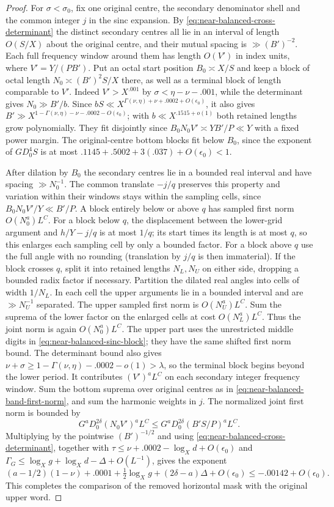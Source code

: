 \documentclass[11pt,a4paper]{article}
\theoremstyle{paperplain}
\numberwithin{equation}{section}
\begin{document}
\begin{proof}
For $\sigma<\sigma_0$, fix one original centre, the
secondary denominator shell and the common integer $j$
in the sinc expansion. By
\eqref{eq:near-balanced-cross-determinant} the distinct
secondary centres all lie in an interval of length $O(S/X)$
about the original centre, and their mutual spacing is
$\gg (B')^{-2}$. Each full frequency window around them
has length $O(V')$ in index units, where $V'=Y/(PB')$.
Put an octal start position $B_0\asymp X/S$ and keep a
block of octal length $N_0\asymp (B')^2 S/X$ there, as
well as a terminal block of length comparable to $V'$.
Indeed $V'>X^{.001}$ by $\sigma<\eta-\nu-.001$, while the
determinant gives $N_0\gg B'/b$. Since $bS\ll
X^{\Gamma(\nu,\eta)+\nu+.0002+O(\epsilon_0)}$, it also gives
$B'\gg X^{1-\Gamma(\nu,\eta)-\nu-.0002-O(\epsilon_0)}$;
with $b\ll X^{.1515+o(1)}$ both retained lengths grow polynomially.
They fit disjointly since $B_0N_0V'\asymp YB'/P\ll Y$
with a fixed power margin. The original-centre bottom
blocks fit below $B_0$, since the exponent of $GD_0^4S$
is at most $.1145+.5002+3(.037)+O(\epsilon_0)<1$.

After dilation by $B_0$ the secondary centres lie in a
bounded real interval and have spacing $\gg N_0^{-1}$.
The common translate $-j/q$ preserves this property and
variation within their windows stays within the sampling
cells, since $B_0N_0V'/Y\ll B'/P$. A block entirely below
or above $q$ has sampled first norm $O(N_0^a)L^C$.
For a block below $q$, the displacement between the lower-grid
argument and $h/Y-j/q$ is at most $1/q$; its start times its
length is at most $q$, so this enlarges each sampling cell by only
a bounded factor. For a block above $q$ use the full angle with no
rounding (translation by $j/q$ is then immaterial). If the block crosses
$q$, split it into retained lengths $N_L,N_U$ on either
side, dropping a bounded radix factor if necessary.
Partition the dilated real angles into cells of width
$1/N_L$. In each cell the upper arguments lie in a
bounded interval and are $\gg N_U^{-1}$ separated. The
upper sampled first norm is $O(N_U^a)L^C$. Sum the
suprema of the lower factor on the enlarged cells at
cost $O(N_L^a)L^C$. Thus the joint norm is again
$O(N_0^a)L^C$. The upper part uses the unrestricted
middle digits in \eqref{eq:near-balanced-sinc-block};
they have the same shifted first norm bound. The determinant bound also gives $\nu+\sigma\ge1-\Gamma(\nu,\eta)-.0002-o(1)>\lambda$,
so the terminal block begins beyond the lower period. It contributes
$(V')^a L^C$ on each
secondary integer frequency window. Sum the bottom
suprema over original centres as in
\eqref{eq:near-balanced-band-first-norm}, and sum the
harmonic weights in $j$. The normalized joint first norm
is bounded by
\[
         G^a D_0^{2\delta}(N_0V')^a L^C
             \le G^a D_0^{2\delta}(B'S/P)^a L^C .
\]
Multiplying by the pointwise $(B')^{-1/2}$ and using
\eqref{eq:near-balanced-cross-determinant}, together with
$\tau\le\nu+.0002-\log_X d+O(\epsilon_0)$ and
$\Gamma_G\le\log_X g+\log_X d-\Delta+O(L^{-1})$,
gives the exponent
\[
  (a-1/2)(1-\nu)+.0001+\tfrac12\log_Xg
                       +(2\delta-a)\Delta+O(\epsilon_0)
          \le-.00142+O(\epsilon_0).
\]
This completes the comparison of the removed horizontal
mask with the original upper word.


\end{proof}
\end{document}

